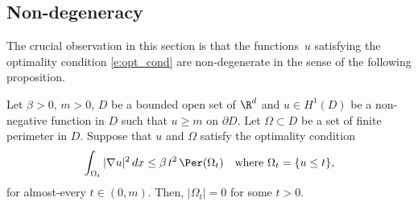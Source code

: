 \subsection{Non-degeneracy} The crucial observation in this section is that the functions~$u$ satisfying the optimality condition \eqref{e:opt_cond} are non-degenerate in the sense of the following proposition.
\begin{prop}\label{p:non-degeneracy}
Let $\beta>0$, $m>0$, $D$ be a bounded open set of $\R^d$ and $u\in H^1(D)$ be a non-negative function in $D$ such that $u\ge m$ on $\partial D$. Let $\Omega\subset D$ be a set of finite perimeter in $D$. Suppose that $u$ and $\Omega$ satisfy the optimality condition
\begin{equation}\label{e:opt_cond_nd}
\int_{\Omega_t}|\nabla u|^2\,dx\le \beta\, t^2\, \Per(\Omega_t)\quad\text{where }\Omega_t=\{u\le t\},
\end{equation}
for almost-every $t\in(0,m)$. Then, $|\Omega_t|=0$ for some $t>0$.
\end{prop}
